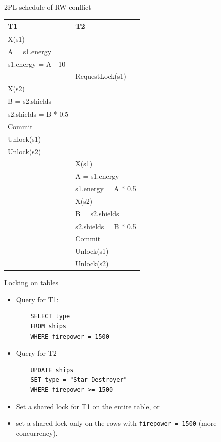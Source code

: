 \documentclass{beamer}
\begin{document}
\begin{slide}{
	\item 2PL schedule of RW conflict
	\begin{table}
		\tiny
		\begin{tabular}{l|l}
			T1 & T2\\
			\hline
			X(s1) & \\
			A = s1.energy & \\
			s1.energy = A - 10 & \\
			& RequestLock(s1) \\
			X(s2) & \\
			B = s2.shields & \\
			s2.shields = B * 0.5 & \\
			Commit & \\
			Unlock(s1) & \\
			Unlock(s2) & \\
			& X(s1) \\
			& A = s1.energy \\
			& s1.energy = A * 0.5 \\
			& X(s2) \\
			& B = s2.shields \\
			& s2.shields = B * 0.5 \\
			& Commit \\
			& Unlock(s1) \\
			& Unlock(s2) \\			
		\end{tabular}
	\end{table}	
}\end{slide}

\begin{frame}[fragile]{Locking on tables}
	\begin{itemize}
	\item Query for T1:
	\begin{lstlisting}
	SELECT type
	FROM ships
	WHERE firepower = 1500
	\end{lstlisting}
	\item Query for T2
	\begin{lstlisting}
	UPDATE ships
	SET type = "Star Destroyer"
	WHERE firepower >= 1500
	\end{lstlisting}
	\item Set a shared lock for T1 on the entire table, or
	\item set a shared lock only on the rows with \texttt{firepower = 1500} (more concurrency).
	\end{itemize}
\end{frame}
\end{document}
